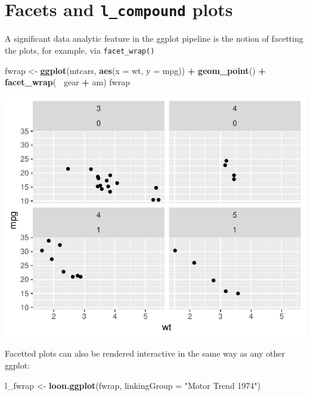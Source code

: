\documentclass[]{article}
\newenvironment{Shaded}{\begin{snugshade}}{\end{snugshade}}
\newcommand{\KeywordTok}[1]{\textcolor[rgb]{0.13,0.29,0.53}{\textbf{#1}}}
\newcommand{\DataTypeTok}[1]{\textcolor[rgb]{0.13,0.29,0.53}{#1}}
\newcommand{\StringTok}[1]{\textcolor[rgb]{0.31,0.60,0.02}{#1}}
\newcommand{\OperatorTok}[1]{\textcolor[rgb]{0.81,0.36,0.00}{\textbf{#1}}}
\newcommand{\NormalTok}[1]{#1}
\begin{document}
\section{\texorpdfstring{Facets and \texttt{l\_compound}
plots}{Facets and l\_compound plots}}\label{facets-and-l_compound-plots}

A significant data analytic feature in the ggplot pipeline is the notion
of facetting the plots, for example, via \texttt{facet\_wrap()}

\begin{Shaded}
\begin{Highlighting}[]
\NormalTok{fwrap <-}\StringTok{ }\KeywordTok{ggplot}\NormalTok{(mtcars, }\KeywordTok{aes}\NormalTok{(}\DataTypeTok{x =}\NormalTok{ wt, }\DataTypeTok{y =}\NormalTok{ mpg)) }\OperatorTok{+}
\StringTok{  }\KeywordTok{geom_point}\NormalTok{() }\OperatorTok{+}
\StringTok{  }\KeywordTok{facet_wrap}\NormalTok{(}\OperatorTok{~}\StringTok{ }\NormalTok{gear }\OperatorTok{+}\StringTok{ }\NormalTok{am) }
\NormalTok{fwrap}
\end{Highlighting}
\end{Shaded}

\begin{center}\includegraphics[width=0.7\linewidth]{ggplots2loon_files/figure-latex/fwrap-1} \end{center}

Facetted plots can also be rendered interactive in the same way as any
other ggplot:

\begin{Shaded}
\begin{Highlighting}[]
\NormalTok{l_fwrap <-}\StringTok{ }\KeywordTok{loon.ggplot}\NormalTok{(fwrap, }\DataTypeTok{linkingGroup =} \StringTok{"Motor Trend 1974"}\NormalTok{)}
\end{Highlighting}
\end{Shaded}
\end{document}
